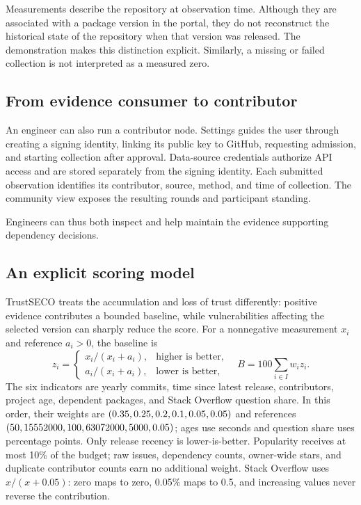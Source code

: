 \documentclass[10pt,conference]{IEEEtran}
\begin{document}
Measurements describe the repository at observation time. Although they are associated with a package version in the portal, they do not reconstruct the historical state of the repository when that version was released. The demonstration makes this distinction explicit. Similarly, a missing or failed collection is not interpreted as a measured zero.

\subsection{From evidence consumer to contributor}
An engineer can also run a contributor node. Settings guides the user through creating a signing identity, linking its public key to GitHub, requesting admission, and starting collection after approval. Data-source credentials authorize API access and are stored separately from the signing identity. Each submitted observation identifies its contributor, source, method, and time of collection. The community view exposes the resulting rounds and participant standing.

Engineers can thus both inspect and help maintain the evidence supporting dependency decisions.

\subsection{An explicit scoring model}
TrustSECO treats the accumulation and loss of trust differently: positive evidence contributes a bounded baseline, while vulnerabilities affecting the selected version can sharply reduce the score. For a nonnegative measurement $x_i$ and reference $a_i>0$, the baseline is
\begin{equation}
 z_i=\begin{cases}x_i/(x_i+a_i),&\text{higher is better},\\a_i/(x_i+a_i),&\text{lower is better},\end{cases}
 \quad B=100\sum_{i\in I}w_i z_i.
\label{eq:normalization}
\end{equation}
The six indicators are yearly commits, time since latest release, contributors, project age, dependent packages, and Stack Overflow question share. In this order, their weights are $(0.35,0.25,0.2,0.1,0.05,0.05)$ and references $(50,15552000,100,63072000,5000,0.05)$; ages use seconds and question share uses percentage points. Only release recency is lower-is-better. Popularity receives at most 10\% of the budget; raw issues, dependency counts, owner-wide stars, and duplicate contributor counts earn no additional weight. Stack Overflow uses $x/(x+0.05)$: zero maps to zero, 0.05\% maps to 0.5, and increasing values never reverse the contribution.
\end{document}
